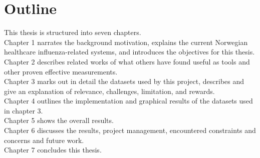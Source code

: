 \section{Outline}
This thesis is structured into seven chapters.
\newline \\Chapter 1 narrates the background motivation, explains the current Norwegian healthcare influenza-related systems, and introduces the objectives for this thesis.
\newline \\Chapter 2 describes related works of what others have found useful as tools and other proven effective measurements.
\newline \\Chapter 3 marks out in detail the datasets used by this project, describes and give an explanation of relevance, challenges, limitation, and rewards.
\newline \\Chapter 4 outlines the implementation and graphical results of the datasets used in chapter 3.
\newline \\Chapter 5 shows the overall results.
\newline \\Chapter 6 discusses the results, project management, encountered constraints and concerns and future work.
\newline \\Chapter 7 concludes this thesis.


\newpage


